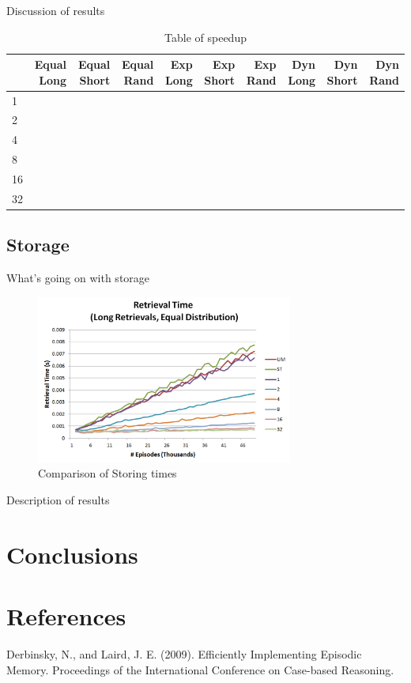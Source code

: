 \documentclass[11pt]{article} %
\begin{document}
Discussion of results

\begin{table}[h]
\caption{Table of speedup}
\centering
    \begin{tabular}{|l|r|r|r|r|r|r|r|r|r|}
        \hline
        ~  & Equal Long & Equal Short & Equal Rand & Exp Long & Exp Short & Exp Rand & Dyn Long & Dyn Short & Dyn Rand \\ \hline
        1  & ~          & ~           & ~          & ~        & ~         & ~        & ~        & ~         & ~        \\  \hline
        2  & ~          & ~           & ~          & ~        & ~         & ~        & ~        & ~         & ~        \\ \hline
        4  & ~          & ~           & ~          & ~        & ~         & ~        & ~        & ~         & ~        \\ \hline
        8  & ~          & ~           & ~          & ~        & ~         & ~        & ~        & ~         & ~        \\ \hline
        16 & ~          & ~           & ~          & ~        & ~         & ~        & ~        & ~         & ~        \\ \hline
        32 & ~          & ~           & ~          & ~        & ~         & ~        & ~        & ~         & ~        \\
        \hline
    \end{tabular}
\end{table}

\subsection{Storage}

What's going on with storage

\begin{figure}[h]
\caption{Comparison of Storing times}
\centering
\includegraphics[width=0.75\textwidth]{images/ret_worst_eq}
\end{figure}

Description of results


\section{Conclusions}

\section{References}

Derbinsky, N., and Laird, J. E. (2009). Efficiently Implementing Episodic
Memory. Proceedings of the International Conference on Case-based Reasoning.
\end{document}
